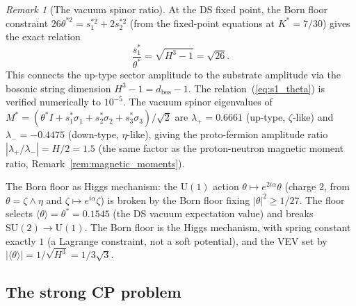 \documentclass[11pt,a4paper]{article}
\theoremstyle{definition}
\theoremstyle{remark}
\newtheorem{remark}[theorem]{Remark}
\begin{document}
\begin{remark}[The vacuum spinor ratio]\label{rem:spinor_ratio}
At the DS fixed point, the Born floor constraint $26\theta^{*2}=s_1^{*2}+2s_2^{*2}$ (from the fixed-point equations at $K^*=7/30$) gives the exact relation
\begin{equation}\label{eq:s1_theta}
\frac{s_1^*}{\theta^*} = \sqrt{H^3-1} = \sqrt{26}.
\end{equation}
This connects the up-type sector amplitude to the substrate amplitude via the bosonic string dimension $H^3-1=d_\mathrm{bos}-1$. The relation~(\ref{eq:s1_theta}) is verified numerically to $10^{-5}$. The vacuum spinor eigenvalues of $M^*=(\theta^*I+s_1^*\sigma_1+s_2^*\sigma_2+s_3^*\sigma_3)/\sqrt{2}$ are $\lambda_+= 0.6661$ (up-type, $\zeta$-like) and $\lambda_-=-0.4475$ (down-type, $\eta$-like), giving the proto-fermion amplitude ratio $|\lambda_+/\lambda_-|=H/2=1.5$ (the same factor as the proton-neutron magnetic moment ratio, Remark~\ref{rem:magnetic_moments}).

The Born floor as Higgs mechanism: the $\mathrm{U}(1)$ action $\theta\mapsto e^{2i\alpha}\theta$ (charge $2$, from $\theta=\zeta\wedge\eta$ and $\zeta\mapsto e^{i\alpha}\zeta$) is broken by the Born floor fixing $|\theta|^2\geq 1/27$. The floor selects $\langle\theta\rangle=\theta^*=0.1545$ (the DS vacuum expectation value) and breaks $\mathrm{SU}(2)\to\mathrm{U}(1)$. The Born floor is the Higgs mechanism, with spring constant exactly $1$ (a Lagrange constraint, not a soft potential), and the VEV set by $|\langle\theta\rangle|=1/\sqrt{H^3}=1/3\sqrt{3}$.
\end{remark}

\subsection{The strong CP problem}\label{sec:strong_cp}
\end{document}
